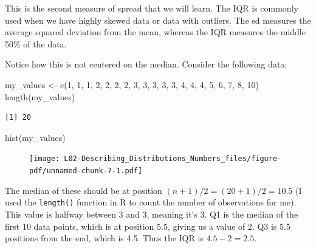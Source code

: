 \documentclass[
  letterpaper,
  DIV=11,
  numbers=noendperiod]{scrreprt}
\newenvironment{Shaded}{\begin{snugshade}}{\end{snugshade}}
\newcommand{\DecValTok}[1]{\textcolor[rgb]{0.68,0.00,0.00}{#1}}
\newcommand{\FunctionTok}[1]{\textcolor[rgb]{0.28,0.35,0.67}{#1}}
\newcommand{\NormalTok}[1]{\textcolor[rgb]{0.00,0.23,0.31}{#1}}
\newcommand{\OtherTok}[1]{\textcolor[rgb]{0.00,0.23,0.31}{#1}}
\begin{document}
This is the second measure of spread that we will learn. The IQR is
commonly used when we have highly skewed data or data with outliers. The
sd measures the average squared deviation from the mean, whereas the IQR
measures the middle 50\% of the data.

Notice how this is not centered on the median. Consider the following
data:

\begin{Shaded}
\begin{Highlighting}[]
\NormalTok{my\_values }\OtherTok{\textless{}{-}} \FunctionTok{c}\NormalTok{(}\DecValTok{1}\NormalTok{, }\DecValTok{1}\NormalTok{, }\DecValTok{1}\NormalTok{, }\DecValTok{2}\NormalTok{, }\DecValTok{2}\NormalTok{, }\DecValTok{2}\NormalTok{, }\DecValTok{2}\NormalTok{, }\DecValTok{3}\NormalTok{, }\DecValTok{3}\NormalTok{, }\DecValTok{3}\NormalTok{, }\DecValTok{3}\NormalTok{, }\DecValTok{3}\NormalTok{, }\DecValTok{4}\NormalTok{, }\DecValTok{4}\NormalTok{, }\DecValTok{4}\NormalTok{, }\DecValTok{5}\NormalTok{, }\DecValTok{6}\NormalTok{, }\DecValTok{7}\NormalTok{, }\DecValTok{8}\NormalTok{, }\DecValTok{10}\NormalTok{)}
\FunctionTok{length}\NormalTok{(my\_values)}
\end{Highlighting}
\end{Shaded}

\begin{verbatim}
[1] 20
\end{verbatim}

\begin{Shaded}
\begin{Highlighting}[]
\FunctionTok{hist}\NormalTok{(my\_values)}
\end{Highlighting}
\end{Shaded}

\begin{figure}[H]

{\centering \texttt{[image: L02-Describing\_Distributions\_Numbers\_files/figure-pdf/unnamed-chunk-7-1.pdf]}

}

\end{figure}

The median of these should be at position
\((n+1)/2 = (20 + 1)/2 = 10.5\) (I used the \texttt{length()} function
in R to count the number of observations for me). This value is halfway
between 3 and 3, meaning it's 3. Q1 is the median of the first 10 data
points, which is at position 5.5, giving us a value of 2. Q3 is 5.5
positions from the end, which is 4.5. Thus the IQR is \(4.5 - 2 = 2.5\).
\end{document}
